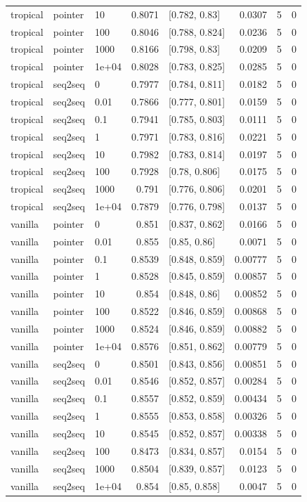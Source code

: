 \documentclass[10pt]{article}
\begin{document}
{\begin{longtable}{lllrlrrr}
tropical & pointer & 10 & 0.8071 & [0.782, 0.83] & 0.0307 & 5 & 0\\
tropical & pointer & 100 & 0.8046 & [0.788, 0.824] & 0.0236 & 5 & 0\\
tropical & pointer & 1000 & 0.8166 & [0.798, 0.83] & 0.0209 & 5 & 0\\
tropical & pointer & 1e+04 & 0.8028 & [0.783, 0.825] & 0.0285 & 5 & 0\\
tropical & seq2seq & 0 & 0.7977 & [0.784, 0.811] & 0.0182 & 5 & 0\\
tropical & seq2seq & 0.01 & 0.7866 & [0.777, 0.801] & 0.0159 & 5 & 0\\
tropical & seq2seq & 0.1 & 0.7941 & [0.785, 0.803] & 0.0111 & 5 & 0\\
tropical & seq2seq & 1 & 0.7971 & [0.783, 0.816] & 0.0221 & 5 & 0\\
tropical & seq2seq & 10 & 0.7982 & [0.783, 0.814] & 0.0197 & 5 & 0\\
tropical & seq2seq & 100 & 0.7928 & [0.78, 0.806] & 0.0175 & 5 & 0\\
tropical & seq2seq & 1000 & 0.791 & [0.776, 0.806] & 0.0201 & 5 & 0\\
tropical & seq2seq & 1e+04 & 0.7879 & [0.776, 0.798] & 0.0137 & 5 & 0\\
vanilla & pointer & 0 & 0.851 & [0.837, 0.862] & 0.0166 & 5 & 0\\
vanilla & pointer & 0.01 & 0.855 & [0.85, 0.86] & 0.0071 & 5 & 0\\
vanilla & pointer & 0.1 & 0.8539 & [0.848, 0.859] & 0.00777 & 5 & 0\\
vanilla & pointer & 1 & 0.8528 & [0.845, 0.859] & 0.00857 & 5 & 0\\
vanilla & pointer & 10 & 0.854 & [0.848, 0.86] & 0.00852 & 5 & 0\\
vanilla & pointer & 100 & 0.8522 & [0.846, 0.859] & 0.00868 & 5 & 0\\
vanilla & pointer & 1000 & 0.8524 & [0.846, 0.859] & 0.00882 & 5 & 0\\
vanilla & pointer & 1e+04 & 0.8576 & [0.851, 0.862] & 0.00779 & 5 & 0\\
vanilla & seq2seq & 0 & 0.8501 & [0.843, 0.856] & 0.00851 & 5 & 0\\
vanilla & seq2seq & 0.01 & 0.8546 & [0.852, 0.857] & 0.00284 & 5 & 0\\
vanilla & seq2seq & 0.1 & 0.8557 & [0.852, 0.859] & 0.00434 & 5 & 0\\
vanilla & seq2seq & 1 & 0.8555 & [0.853, 0.858] & 0.00326 & 5 & 0\\
vanilla & seq2seq & 10 & 0.8545 & [0.852, 0.857] & 0.00338 & 5 & 0\\
vanilla & seq2seq & 100 & 0.8473 & [0.834, 0.857] & 0.0154 & 5 & 0\\
vanilla & seq2seq & 1000 & 0.8504 & [0.839, 0.857] & 0.0123 & 5 & 0\\
vanilla & seq2seq & 1e+04 & 0.854 & [0.85, 0.858] & 0.0047 & 5 & 0\\
\bottomrule
\end{longtable}
}
\end{document}
